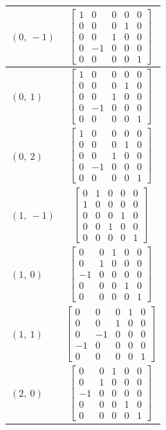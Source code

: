\documentclass[11pt]{article}
\theoremstyle{definition}
\begin{document}
\begin{longtable}{|l|c|}
    \hline
    $\left( 0, \  -1\right)$ & ${\left[\begin{matrix}1 & 0 & 0 & 0 & 0\\0 & 0 & 0 & 1 & 0\\0 & 0 & 1 & 0 & 0\\0 & -1 & 0 & 0 & 0\\0 & 0 & 0 & 0 & 1\end{matrix}\right]}$ \\
    \hline
    $\left( 0, \  1\right)$ & ${\left[\begin{matrix}1 & 0 & 0 & 0 & 0\\0 & 0 & 0 & 1 & 0\\0 & 0 & 1 & 0 & 0\\0 & -1 & 0 & 0 & 0\\0 & 0 & 0 & 0 & 1\end{matrix}\right]}$ \\
    \hline
    $\left( 0, \  2\right)$ & ${\left[\begin{matrix}1 & 0 & 0 & 0 & 0\\0 & 0 & 0 & 1 & 0\\0 & 0 & 1 & 0 & 0\\0 & -1 & 0 & 0 & 0\\0 & 0 & 0 & 0 & 1\end{matrix}\right]}$ \\
    \hline
    $\left( 1, \  -1\right)$ & ${\left[\begin{matrix}0 & 1 & 0 & 0 & 0\\1 & 0 & 0 & 0 & 0\\0 & 0 & 0 & 1 & 0\\0 & 0 & 1 & 0 & 0\\0 & 0 & 0 & 0 & 1\end{matrix}\right]}$ \\
    \hline
    $\left( 1, \  0\right)$ & ${\left[\begin{matrix}0 & 0 & 1 & 0 & 0\\0 & 1 & 0 & 0 & 0\\-1 & 0 & 0 & 0 & 0\\0 & 0 & 0 & 1 & 0\\0 & 0 & 0 & 0 & 1\end{matrix}\right]}$ \\
    \hline
    $\left( 1, \  1\right)$ & ${\left[\begin{matrix}0 & 0 & 0 & 1 & 0\\0 & 0 & 1 & 0 & 0\\0 & -1 & 0 & 0 & 0\\-1 & 0 & 0 & 0 & 0\\0 & 0 & 0 & 0 & 1\end{matrix}\right]}$ \\
    \hline
    $\left( 2, \  0\right)$ & ${\left[\begin{matrix}0 & 0 & 1 & 0 & 0\\0 & 1 & 0 & 0 & 0\\-1 & 0 & 0 & 0 & 0\\0 & 0 & 0 & 1 & 0\\0 & 0 & 0 & 0 & 1\end{matrix}\right]}$ \\
    \hline
\end{longtable}
\end{document}
